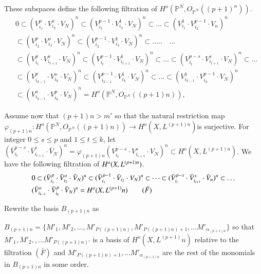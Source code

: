 \noindent
These subspaces define the following filtration of $H^o  (\mathbb{P}^N,
O_{\mathbb{P}^N} ((p+1)^n))$. 
{\fontsize{10}{12}\selectfont
\begin{align*}
& 0 \subset (V^p_{i_1} \cdot  V^o_{i_2} \cdot V_N)^n \subset
  (V^{p-1}_{i_1} \cdot  V^1_{i_2} \cdot  V_N)^n \subset \dots \subset
  (V^1_{i_1} \cdot  V^{p-1}_{i_2} \cdot  V_n)^n \\
&  \subset (V^p_{i_2} \cdot  V^o_{i_3} \cdot  V_N)^n \subset
(V^{p-1}_{i_2} \cdot  V^1_{i_3} \cdot  V_N)^n \subset .. \dots
  \quad\dots\\
&  \subset (V^p_{i_t} \cdot  V^o_{i_{t+1}}  \cdot V_N)^n \subset
 (V^{p-1}_{i_t} \cdot  V^1_{i_{t+1}}  \cdot  V_N)^n \subset \dots \subset
 (V^{p-s}_{i_{t}} \cdot  V^s_{i_{t+1}}  \cdot  V_N)^n \subset \dots \\
& \subset (V^p_{i_{k-1}} \cdot V^o_{i_k} \cdot  V_N)^n \subset
(V^{p-1}_{i_{k-1}} \cdot V^1_{i_k} \cdot  V_N)^n \subset \ldots
  \subset (V^1_{i_{k-1}} \cdot V^{p-1}_{i_k} \cdot  V_N)^n\\
& \subset (V^o_{i_{k-1}} \cdot V^p_{i_k} \cdot  V_N)^n = H^o
  (\mathbb{P}^N, O_{\mathbb{P}^N} (( p+1)n)), \tag{F}
\end{align*}}\relax

Assume now that $(p+1)n > m'$ so that the natural restriction map
$\varphi_{(p+1)n} : H^o (\mathbb{P}^N, O_{\mathbb{P}^N} ((p+1)n)) \to
H^o (X, L^{(p+1)n})$\pageoriginale is surjective. For integer $0 \le s
\le p$  and $1 \le t \le k $, let 
 $(\bar{V}^{p-s}_{i_t} \cdot \bar{V}^{s}_{i_{t+1}} \cdot \bar{V}_N )^n =
\varphi_{(p+1)n}( V^{p-s}_{i_t}  \cdot V^s_{i_{t+1}} \cdot  V_N)^n \subset
H^o (X, L^{(p+1)n})$. We have the following filtration of $H^o (X,\break
L^{(p+1)n})$.   
 \begin{align*}
&  0 \subset (\bar{V}^{p}_{i_1} \cdot  \bar{V}^o_{i_2} \cdot \bar{V}_N)^n
 \subset (\bar{V}^{p-1}_{i_1} \cdot  \bar{V}_{i_2} \cdot  V_N)^n \subset \dots
 \subset (\bar{V}^{p-s}_{i_t}\cdot  \bar{V}^s_{i_{t+1}} \cdot  \bar{V}_n)^n
 \subset \dots\\
&  (\bar{V}^{o}_{i_{k-1}} \cdot  \bar{V}^{p}_{i_k} \cdot \bar{V}_N)^n  =H^o
 (X,L ^{(p+1)}n) \tag{$\bar{F}$}
 \end{align*}
 
 \noindent
 Rewrite the basis $B_{(p+1)n} $ as

\noindent 
 $B_{(p+1)n} = \{M'_1, M'_2, \ldots,  M'_{P((p+1)n)},  M'_{P((p+1)n)+1}
,\ldots M'_{\alpha_{(p+1)n}}\}$ so that \break $M'_1, M'_2, ,\ldots
M'_{P((p+1)n)'} $ is a basis of $ H^o (X,L ^{(p+1)}n)$ relative to the
filtration $(\bar{F})$ and $M'_{P((p+1)n)+1} ,\ldots
M'_{\alpha{_{(p+1)n}}}$ are the rest of the monomials in $B_{(p+1)n}$
in some order. 
 
